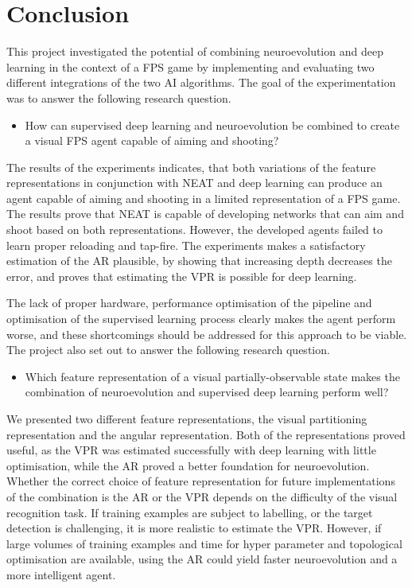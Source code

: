 \section{Conclusion}
\label{sec:conclusion}
This project investigated the potential of combining neuroevolution and deep learning in the context of a FPS game by implementing and evaluating two different integrations of the two AI algorithms. The goal of the experimentation was to answer the following research question.
\begin{itemize}
\item How can supervised deep learning and neuroevolution be combined to create a visual FPS agent capable of aiming and shooting?
\end{itemize}
The results of the experiments indicates, that both variations of the feature representations in conjunction with NEAT and deep learning can produce an agent capable of aiming and shooting in a limited representation of a FPS game. The results prove that NEAT is capable of developing networks that can aim and shoot based on both representations. However, the developed agents failed to learn proper reloading and tap-fire. The experiments makes a satisfactory estimation of the AR plausible, by showing that increasing depth decreases the error, and proves that estimating the VPR is possible for deep learning.

The lack of proper hardware, performance optimisation of the pipeline and optimisation of the supervised learning process clearly makes the agent perform worse, and these shortcomings should be addressed for this approach to be viable. The project also set out to answer the following research question.
\begin{itemize}
\item Which feature representation of a visual partially-observable state makes the combination of neuroevolution and supervised deep learning perform well?
\end{itemize}
We presented two different feature representations, the visual partitioning representation and the angular representation. Both of the representations proved useful, as the VPR was estimated successfully with deep learning with little optimisation, while the AR proved a better foundation for neuroevolution. Whether the correct choice of feature representation for future implementations of the combination is the AR or the VPR depends on the difficulty of the visual recognition task. If training examples are subject to labelling, or the target detection is challenging, it is more realistic to estimate the VPR. However, if large volumes of training examples and time for hyper parameter and topological optimisation are available, using the AR could yield faster neuroevolution and a more intelligent agent.
